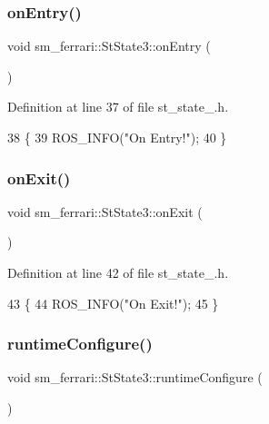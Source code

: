 \subsubsection{\texorpdfstring{on\+Entry()}{onEntry()}}
{\footnotesize\ttfamily void sm\+\_\+ferrari\+::\+St\+State3\+::on\+Entry (\begin{DoxyParamCaption}{ }\end{DoxyParamCaption})\hspace{0.3cm}{\ttfamily [inline]}}



Definition at line 37 of file st\+\_\+state\+\_.\+h.


\begin{DoxyCode}
38     \{
39         ROS\_INFO(\textcolor{stringliteral}{"On Entry!"});
40     \}
\end{DoxyCode}
\mbox{\label{structsm__ferrari_1_1StState3_a8daa8639391cb98bc3ba5ac146cd19ad}} 
\subsubsection{\texorpdfstring{on\+Exit()}{onExit()}}
{\footnotesize\ttfamily void sm\+\_\+ferrari\+::\+St\+State3\+::on\+Exit (\begin{DoxyParamCaption}{ }\end{DoxyParamCaption})\hspace{0.3cm}{\ttfamily [inline]}}



Definition at line 42 of file st\+\_\+state\+\_.\+h.


\begin{DoxyCode}
43     \{
44         ROS\_INFO(\textcolor{stringliteral}{"On Exit!"});
45     \}
\end{DoxyCode}
\mbox{\label{structsm__ferrari_1_1StState3_aff80710783f94ee3d8d430da69c2a34f}} 
\subsubsection{\texorpdfstring{runtime\+Configure()}{runtimeConfigure()}}
{\footnotesize\ttfamily void sm\+\_\+ferrari\+::\+St\+State3\+::runtime\+Configure (\begin{DoxyParamCaption}{ }\end{DoxyParamCaption})\hspace{0.3cm}{\ttfamily [inline]}}



